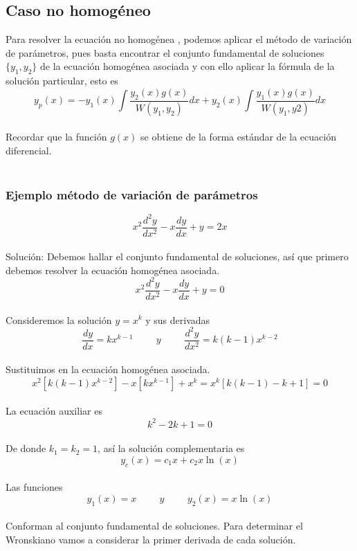 \documentclass[12pt,letterpaper]{article}
\begin{document}
\subsection{\large Caso no homogéneo}
Para resolver la ecuación no homogénea , podemos aplicar el método de variación de parámetros, pues basta encontrar el conjunto fundamental de soluciones $\{y_{1}, y_{2}\}$ de la ecuación homogénea asociada y con ello aplicar la fórmula de la solución particular, esto es\\
$$y_{p}(x)=-y_{1}(x)\int{\frac{y_{2}(x)g(x)}{W(y_{1},y_{2})}dx}+y_{2}(x)\int{\frac{y_{1}(x)g(x)}{W(y_{1},y{2})}dx}$$\\
Recordar que la función $g(x)$ se obtiene de la forma estándar de la ecuación diferencial.\\\\
\subsubsection{Ejemplo método de variación de parámetros}
$$x^{2}\frac{d^{2}y}{dx^{2}}-x\frac{dy}{dx}+y=2x$$\\
Solución: Debemos hallar el conjunto fundamental de soluciones, así que primero debemos resolver la ecuación homogénea asociada.\\
$$x^{2}\frac{d^{2}y}{dx^{2}}-x\frac{dy}{dx}+y=0$$\\
Consideremos la solución $y=x^{k}$ y sus derivadas\\
$$\frac{dy}{dx}=kx^{k-1}\hspace{1cm}y\hspace{1cm}\frac{d^{2}y}{dx^{2}}=k(k-1)x^{k-2}$$\\
Sustituimos en la ecuación homogénea asociada.\\
$$x^{2}\left[k(k-1)x^{k-2}\right]-x\left[kx^{k-1}\right]+x^{k}=x^{k}\left[k(k-1)-k+1\right]=0$$\\
La ecuación auxiliar es\\
$$k^{2}-2k+1=0$$\\
De donde $k_{1}=k_{2}=1$, así la solución complementaria es\\
$$y_{c}(x)=c_{1}x+c_{2}x\ln(x)$$\\
Las funciones \\
$$y_{1}(x)=x\hspace{1cm}y\hspace{1cm}y_{2}(x)=x\ln(x)$$\\
Conforman al conjunto fundamental de soluciones. Para determinar el Wronskiano vamos a considerar la primer derivada de cada solución.\\
\end{document}

